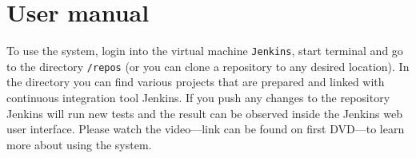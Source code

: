\section{User manual}
To use the system, login into the virtual machine \texttt{Jenkins}, start terminal and go to the directory \texttt{/repos} (or you can clone a repository to any desired location). In the directory you can find various projects that are prepared and linked with continuous integration tool Jenkins. If you push any changes to the repository Jenkins will run new tests and the result can be observed inside the Jenkins web user interface. Please watch the video---link can be found on first DVD---to learn more about using the system.


